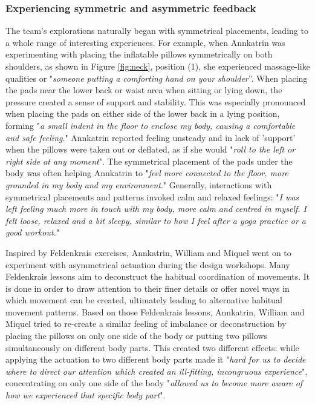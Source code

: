 \subsubsection{Experiencing symmetric and asymmetric feedback}

The team's explorations naturally began with symmetrical placements, leading to a whole range of interesting experiences. For example, when Annkatrin was experimenting with placing the inflatable pillows symmetrically on both shoulders, as shown in Figure \ref{fig:neck}, position (1), she experienced massage-like qualities or "\textit{someone putting a comforting hand on your shoulder}”. When placing the pads near the lower back or waist area when sitting or lying down, the pressure created a sense of support and stability. This was especially pronounced when placing the pads on either side of the lower back in a lying position, forming "\textit{a small indent in the floor to enclose my body, causing a comfortable and safe feeling}." Annkatrin reported feeling unsteady and in lack of 'support' when the pillows were taken out or deflated, as if she would "\textit{roll to the left or right side at any moment}". The symmetrical placement of the pads under the body was often helping Annkatrin to "\textit{feel more connected to the floor, more grounded in my body and my environment}." Generally, interactions with symmetrical placements and patterns invoked calm and relaxed feelings: "\textit{I was left feeling much more in touch with my body, more calm and centred in myself. I felt loose, relaxed and a bit sleepy, similar to how I feel after a yoga practice or a good workout.}" 

Inspired by Feldenkrais exercises, Annkatrin, William and Miquel went on to experiment with asymmetrical actuation during the design workshops. Many Feldenkrais lessons aim to deconstruct the habitual coordination of movements. It is done in order to draw attention to their finer details or offer novel ways in which movement can be created, ultimately leading to alternative habitual movement patterns. Based on those Feldenkrais lessons, Annkatrin, William and Miquel tried to re-create a similar feeling of imbalance or deconstruction by placing the pillows on only one side of the body or putting two pillows simultaneously on different body parts. This created two different effects: while applying the actuation to two different body parts made it "\textit{hard for us to decide where to direct our attention which created an ill-fitting, incongruous experience}", concentrating on only one side of the body "\textit{allowed us to become more aware of how we experienced that specific body part}".


